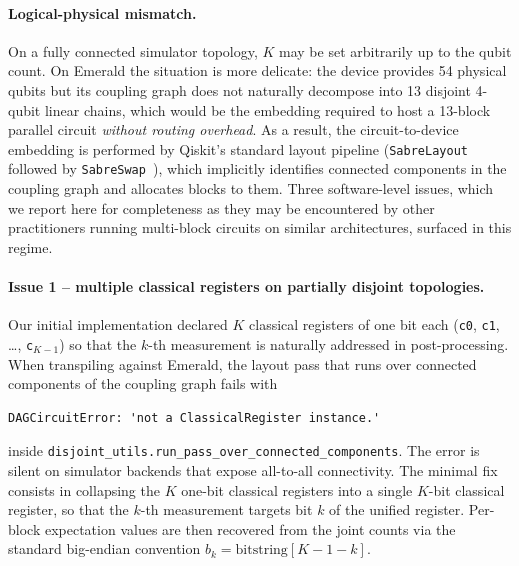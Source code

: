 \paragraph{Logical-physical mismatch.}
On a fully connected simulator topology, $K$ may be set arbitrarily up to the qubit count. On Emerald the situation is more delicate: the device provides 54 physical qubits but its coupling graph does not naturally decompose into 13 disjoint 4-qubit linear chains, which would be the embedding required to host a 13-block parallel circuit \emph{without routing overhead}. As a result, the circuit-to-device embedding is performed by Qiskit's standard layout pipeline (\texttt{SabreLayout} followed by \texttt{SabreSwap}~\cite{Li2019Sabre}), which implicitly identifies connected components in the coupling graph and allocates blocks to them. Three software-level issues, which we report here for completeness as they may be encountered by other practitioners running multi-block circuits on similar architectures, surfaced in this regime.

\paragraph{Issue 1 -- multiple classical registers on partially disjoint topologies.}
Our initial implementation declared $K$ classical registers of one bit each (\texttt{c0}, \texttt{c1}, \dots, \texttt{c}$_{K-1}$) so that the $k$-th measurement is naturally addressed in post-processing. When transpiling against Emerald, the layout pass that runs over connected components of the coupling graph fails with
\begin{verbatim}
DAGCircuitError: 'not a ClassicalRegister instance.'
\end{verbatim}
inside \texttt{disjoint\_utils.run\_pass\_over\_connected\_components}. The error is silent on simulator backends that expose all-to-all connectivity. The minimal fix consists in collapsing the $K$ one-bit classical registers into a single $K$-bit classical register, so that the $k$-th measurement targets bit $k$ of the unified register. Per-block expectation values are then recovered from the joint counts via the standard big-endian convention $b_k = \mathrm{bitstring}[K-1-k]$.

